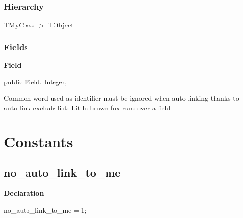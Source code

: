 \documentclass{report}
\newif\ifpdf
\begin{document}
\subsubsection*{\large{\textbf{Hierarchy}}\normalsize\hspace{1ex}\hfill}
TMyClass {$>$} TObject
\subsubsection*{\large{\textbf{Fields}}\normalsize\hspace{1ex}\hfill}
\begin{list}{}{
\setlength{\itemindent}{0cm}
\setlength{\listparindent}{0cm}
\setlength{\leftmargin}{\evensidemargin}
\addtolength{\leftmargin}{\tmplength}
\settowidth{\labelsep}{X}
\addtolength{\leftmargin}{\labelsep}
\setlength{\labelwidth}{\tmplength}
}
\label{ok_auto_link.TMyClass-Field}
\item[\textbf{Field}\hfill]
\ifpdf
\begin{flushleft}
\fi
\begin{ttfamily}
public Field: Integer;\end{ttfamily}

\ifpdf
\end{flushleft}
\fi


\par Common word used as identifier must be ignored when auto{-}linking thanks to auto{-}link{-}exclude list: Little brown fox runs over a field\end{list}
\section{Constants}
\ifpdf
\subsection*{\large{\textbf{no{\_}auto{\_}link{\_}to{\_}me}}\normalsize\hspace{1ex}\hrulefill}
\else
\subsection*{no{\_}auto{\_}link{\_}to{\_}me}
\fi
\label{ok_auto_link-no_auto_link_to_me}
\begin{list}{}{
\setlength{\itemindent}{0cm}
\setlength{\listparindent}{0cm}
\setlength{\leftmargin}{\evensidemargin}
\addtolength{\leftmargin}{\tmplength}
\settowidth{\labelsep}{X}
\addtolength{\leftmargin}{\labelsep}
\setlength{\labelwidth}{\tmplength}
}
\item[\textbf{Declaration}\hfill]
\ifpdf
\begin{flushleft}
\fi
\begin{ttfamily}
no{\_}auto{\_}link{\_}to{\_}me = 1;\end{ttfamily}

\ifpdf
\end{flushleft}
\fi

\end{list}
\end{document}
